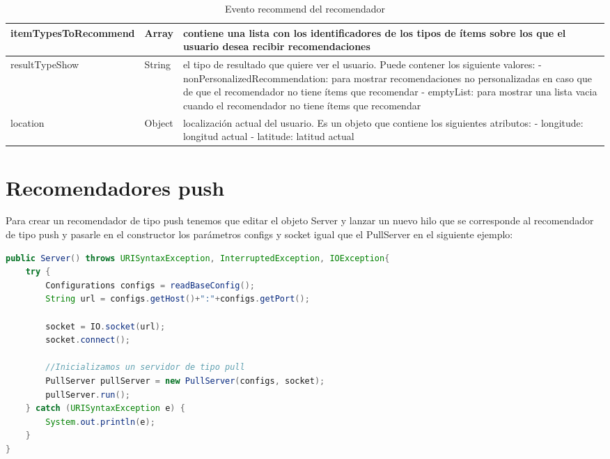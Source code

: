 \begin{table}[H]
\begin{tabular}{|l|l|p{6cm}|}
		itemTypesToRecommend                  & Array                              & contiene una lista con los identificadores de los tipos de ítems sobre los que el usuario desea recibir recomendaciones                                                                                                                                                                                                                                 \\ \hline
		resultTypeShow                        & String                             & el tipo de resultado que quiere ver el usuario. Puede contener los siguiente valores: \newline - nonPersonalizedRecommendation: para mostrar recomendaciones no personalizadas en caso que de que el recomendador no tiene ítems que recomendar \newline - emptyList: para mostrar una lista vacia cuando el recomendador no tiene ítems que recomendar \\ \hline
		location                              & Object                             & localización actual del usuario. Es un objeto que contiene los siguientes atributos: \newline- longitude: longitud actual \newline - latitude: latitud actual                                                                                                                                                                                           \\ \hline
	\end{tabular}
	\caption{Evento recommend del recomendador}
\end{table}

\newpage

\section{Recomendadores push}

Para crear un recomendador de tipo push tenemos que editar el objeto Server y lanzar un nuevo hilo que se corresponde al recomendador de tipo push y pasarle en el constructor los parámetros configs y socket igual que el PullServer en el siguiente ejemplo: 

\begin{lstlisting}[language=java, frame=single]
public Server() throws URISyntaxException, InterruptedException, IOException{
	try {
		Configurations configs = readBaseConfig();
		String url = configs.getHost()+":"+configs.getPort();
		
		socket = IO.socket(url);
		socket.connect();
		
		//Inicializamos un servidor de tipo pull
		PullServer pullServer = new PullServer(configs, socket);
		pullServer.run();
	} catch (URISyntaxException e) {
		System.out.println(e);
	}
}
\end{lstlisting}

